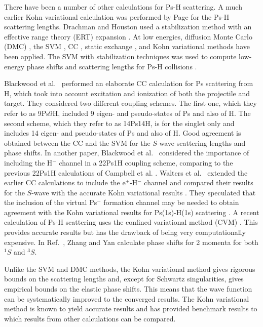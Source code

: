 \documentclass[Dissertation.tex]{subfiles}
\begin{document}
There have been a number of other calculations for Ps-H scattering. A much 
earlier Kohn variational calculation was performed by Page \cite{Page1976} 
for the Ps-H scattering lengths. Drachman and Houston used a stabilization 
method with an effective range theory (ERT) expansion
\cite{Drachman1975,Drachman1976}. At low energies, diffusion Monte Carlo (DMC)
\cite{Chiesa2002}, the SVM \cite{Ivanov2001,Ivanov2002}, CC
\cite{Sinha1997,Campbell1998,Adhikari1999,Sinha2000,Blackwood2002,Blackwood2002b,Walters2004},
static exchange \cite{Hara1975,Ray1997}, and Kohn variational
\cite{Page1976,VanReeth2003,VanReeth2004} methods have been applied. The SVM
with stabilization 
techniques was used to compute low-energy phase shifts and 
scattering lengths for Ps-H collisions \cite{Ivanov2001,Ivanov2002}.

Blackwood et al.~\cite{Blackwood2002} performed an elaborate CC calculation 
for Ps scattering from H, which took into account excitation and ionization 
of both the projectile and target. They considered two different coupling 
schemes. The first one, which they refer to as 9Ps9H, included 9 eigen- and 
pseudo-states of Ps and also of H. The second scheme, which they refer to as 
14Ps14H, is for the singlet only and includes 14 eigen- and pseudo-states of 
Ps and also of H. Good agreement is obtained between the CC
\cite{Blackwood2002} and the SVM \cite{Ivanov2002} for the $S$-wave scattering
lengths and phase shifts. In another paper, Blackwood et
al.~\cite{Blackwood2002b} considered the importance of including the H$^-$
channel in a 22Ps1H coupling scheme, comparing to the previous 22Ps1H
calculations of Campbell et al. \cite{Campbell1998}. Walters et
al.~\cite{Walters2004} extended the earlier CC calculations
\cite{Blackwood2002} to include the e$^+$-H$^-$ channel
\cite{Blackwood2002b} and compared their results for the $S$-wave with the
accurate Kohn variational results \cite{VanReeth2003}. They speculated that the
inclusion of the virtual Ps$^-$ formation channel may be needed to obtain 
agreement with the Kohn variational results for Ps(1s)-H(1s) scattering 
\cite{Blackwood2002}. A recent calculation of Ps-H scattering uses the
confined variational method (CVM) \cite{Zhang2012}. This provides accurate
results but has the drawback of being very computationally expensive. In
Ref.~\cite{Zhang2012}, Zhang and Yan calculate phase shifts for 2 momenta for
both $^1S$ and $^3S$.

Unlike the SVM and DMC methods, the Kohn variational method gives rigorous 
bounds on the scattering lengths and, except for Schwartz singularities, 
gives empirical bounds on the elastic phase shifts. This means that the wave 
function can be systematically improved to the converged results. The Kohn 
variational method is known to yield accurate results and has provided 
benchmark results \cite{VanReeth2003,VanReeth2004} to which results from 
other calculations can be compared. %
\end{document}
